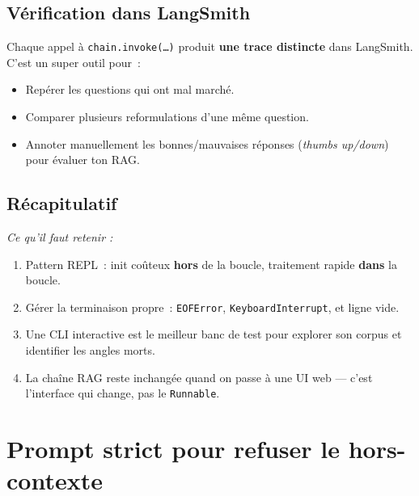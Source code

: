 \documentclass[11pt,a4paper]{article}
\begin{document}
\subsection{Vérification dans LangSmith}

Chaque appel à \texttt{chain.invoke(\dots)} produit \textbf{une trace
distincte} dans LangSmith. C'est un super outil pour~:
\begin{itemize}[leftmargin=*]
  \item Repérer les questions qui ont mal marché.
  \item Comparer plusieurs reformulations d'une même question.
  \item Annoter manuellement les bonnes/mauvaises réponses
        (\emph{thumbs up/down}) pour évaluer ton RAG.
\end{itemize}

\subsection*{Récapitulatif}
{\itshape\sloppy
\textit{Ce qu'il faut retenir :}
\begin{enumerate}[leftmargin=*]
  \item Pattern REPL~: init coûteux \textbf{hors} de la boucle, traitement
        rapide \textbf{dans} la boucle.
  \item Gérer la terminaison propre~: \texttt{EOFError},
        \texttt{KeyboardInterrupt}, et ligne vide.
  \item Une CLI interactive est le meilleur banc de test pour explorer
        son corpus et identifier les angles morts.
  \item La chaîne RAG reste inchangée quand on passe à une UI web — c'est
        l'interface qui change, pas le \texttt{Runnable}.
\end{enumerate}
\par}

\section{Prompt strict pour refuser le hors-contexte}
\end{document}
